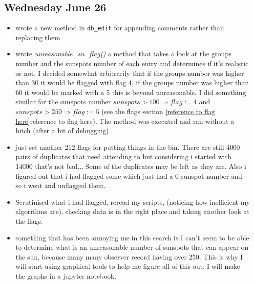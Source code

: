 \documentclass[12pt]{article}
\begin{document}
\subsection{Wednesday June 26}
\begin{itemize}
    \item wrote a new method in \texttt{db\_edit} for appending comments rather than replacing them
    \item wrote \textit{unreasonable\_sn\_flag()} a method that takes a look at the groups number and the sunspots number of each entry and determines if it's realistic or not. I decided somewhat arbitrarily that if the groups number was higher than 30 it would be flagged with flag 4, if the groups number was higher than 60 it would be marked with a 5 this is beyond unreasonable. I did something similar for the sunspots number $sunspots>100\Rightarrow flag:=4$ and $sunspots>250\Rightarrow flag:=5$ (see the flags section \ref{reference to flag here}reference to flag here). The method was executed and ran without a hitch (after a bit of debugging)
    \item just set another 212 flags for putting things in the bin. There are still 4000 pairs of duplicates that need attending to but considering i started with 14000 that's not bad... Some of the duplicates may be left as they are. Also i figured out that i had flagged some which just had a 0 sunspot number and so i went and unflagged them.
    \item Scrutinised what i had flagged, reread my scripts, (noticing how inefficient my algorithms are), checking data is in the right place and taking another look at the flags.
    \item something that has been annoying me in this search is I can't seem to be able to determine what is an unreasonable number of sunspots that can appear on the sun, because many many observer record having over 250. This is why I will start using graphical tools to help me figure all of this out. I will make the graphs in a jupyter notebook.
\end{itemize}
    
\end{document}
